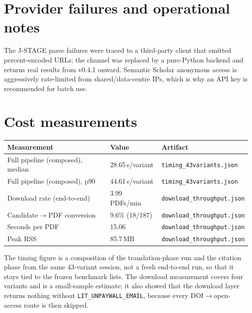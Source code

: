 \documentclass[11pt]{article}
\newcommand{\code}[1]{\texttt{#1}}
\begin{document}
\section{Provider failures and operational notes}


The J-STAGE parse failures were traced to a third-party client that emitted
percent-encoded URLs; the channel was replaced by a pure-Python backend and
returns real results from v0.4.1 onward. Semantic Scholar anonymous access is
aggressively rate-limited from shared/data-centre IPs, which is why an API key
is recommended for batch use.

\section{Cost measurements}
\noindent
\begin{tabular}{@{}lll@{}}
\toprule
Measurement & Value & Artifact \\
\midrule
Full pipeline (composed), median & 28.65\,s/variant & \code{timing\_43variants.json} \\
Full pipeline (composed), p90 & 44.61\,s/variant & \code{timing\_43variants.json} \\
Download rate (end-to-end) & 3.99 PDFs/min & \code{download\_throughput.json} \\
Candidate$\rightarrow$PDF conversion & 9.6\% (18/187) & \code{download\_throughput.json} \\
Seconds per PDF & 15.06 & \code{download\_throughput.json} \\
Peak RSS & 85.7\,MB & \code{download\_throughput.json} \\
\bottomrule
\end{tabular}

\medskip
The timing figure is a composition of the translation-phase run and the
citation phase from the same 43-variant session, not a fresh end-to-end run, so
that it stays tied to the frozen benchmark lists. The download measurement
covers four variants and is a small-sample estimate; it also showed that the
download layer returns nothing without \code{LIT\_UNPAYWALL\_EMAIL}, because
every DOI$\rightarrow$open-access route is then skipped.
\end{document}
